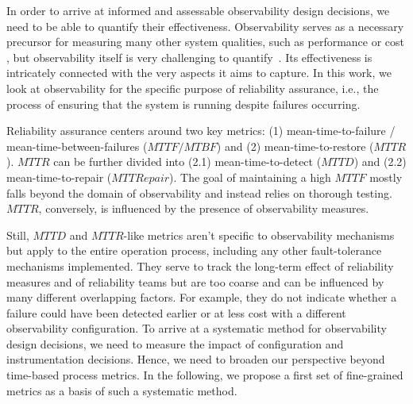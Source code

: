 In order to arrive at informed and assessable observability design decisions, we need to be able to quantify their effectiveness. Observability serves as a necessary precursor for measuring many other system qualities, such as performance \cite{Ahmed_EffectivenessOfAPM_2016} or cost \cite{Kuhlenkamp_Costradamus_2017}, but observability itself is very challenging to quantify~\cite{Tamburri_MVCObservability_2018}. 
Its effectiveness is intricately connected with the very aspects it aims to capture. 
In this work, we look at observability for the specific purpose of reliability assurance, i.e., the process of ensuring that the system is running despite failures occurring.

Reliability assurance centers around two key metrics: (1) mean-time-to-failure / mean-time-between-failures ($MTTF / MTBF$) and (2) mean-time-to-restore ($MTTR$). $MTTR$ can be further divided into (2.1) mean-time-to-detect ($MTTD$) and (2.2) mean-time-to-repair ($MTTRepair$). 
The goal of maintaining a high $MTTF$ mostly falls beyond the domain of observability and instead relies on thorough testing. $MTTR$, conversely, is influenced by the presence of observability measures. 

Still, $MTTD$ and $MTTR$-like metrics aren't specific to observability mechanisms but apply to the entire operation process, including any other fault-tolerance mechanisms implemented. They serve to track the long-term effect of reliability measures and of reliability teams but are too coarse and can be influenced by many different overlapping factors.
For example, they do not indicate whether a failure could have been detected earlier or at less cost with a different observability configuration. To arrive at a systematic method for observability design decisions, we need to measure the impact of configuration and instrumentation decisions. Hence, we need to broaden our perspective beyond time-based process metrics. In the following, we propose a first set of fine-grained metrics as a basis of such a systematic method. 

